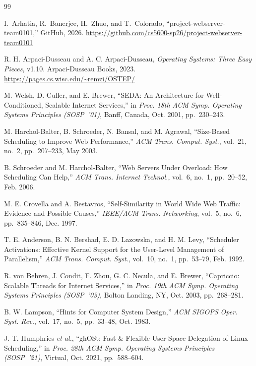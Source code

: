 \documentclass[conference]{IEEEtran}
\begin{document}
\begin{thebibliography}{99}

I.~Arhatia, R.~Banerjee, H.~Zhuo, and T.~Colorado,
``project-webserver-team0101,''
GitHub, 2026.
\url{https://github.com/cs5600-sp26/project-webserver-team0101}

R. H. Arpaci-Dusseau and A. C. Arpaci-Dusseau,
\textit{Operating Systems: Three Easy Pieces}, v1.10.
Arpaci-Dusseau Books, 2023.
\url{https://pages.cs.wisc.edu/~remzi/OSTEP/}

M. Welsh, D. Culler, and E. Brewer,
``SEDA: An Architecture for Well-Conditioned, Scalable Internet Services,''
in \textit{Proc. 18th ACM Symp. Operating Systems Principles (SOSP~'01)},
Banff, Canada, Oct. 2001, pp.~230--243.

M. Harchol-Balter, B. Schroeder, N. Bansal, and M. Agrawal,
``Size-Based Scheduling to Improve Web Performance,''
\textit{ACM Trans. Comput. Syst.}, vol.~21, no.~2, pp.~207--233, May 2003.

B. Schroeder and M. Harchol-Balter,
``Web Servers Under Overload: How Scheduling Can Help,''
\textit{ACM Trans. Internet Technol.}, vol.~6, no.~1, pp.~20--52, Feb. 2006.

M. E. Crovella and A. Bestavros,
``Self-Similarity in World Wide Web Traffic: Evidence and Possible Causes,''
\textit{IEEE/ACM Trans. Networking}, vol.~5, no.~6, pp.~835--846, Dec. 1997.

T. E. Anderson, B. N. Bershad, E. D. Lazowska, and H. M. Levy,
``Scheduler Activations: Effective Kernel Support for the User-Level
Management of Parallelism,''
\textit{ACM Trans. Comput. Syst.}, vol.~10, no.~1, pp.~53--79, Feb. 1992.

R. von Behren, J. Condit, F. Zhou, G. C. Necula, and E. Brewer,
``Capriccio: Scalable Threads for Internet Services,''
in \textit{Proc. 19th ACM Symp. Operating Systems Principles (SOSP~'03)},
Bolton Landing, NY, Oct. 2003, pp.~268--281.

B. W. Lampson,
``Hints for Computer System Design,''
\textit{ACM SIGOPS Oper. Syst. Rev.}, vol.~17, no.~5, pp.~33--48, Oct. 1983.

J. T. Humphries \textit{et al.},
``ghOSt: Fast \& Flexible User-Space Delegation of Linux Scheduling,''
in \textit{Proc. 28th ACM Symp. Operating Systems Principles (SOSP~'21)},
Virtual, Oct. 2021, pp.~588--604.


\end{thebibliography}
\end{document}
